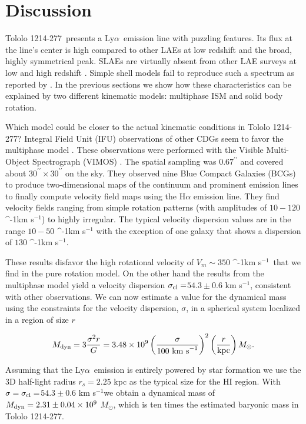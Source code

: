 \documentclass[a4paper,fleqn,usenatbib]{mnras}
\newcommand{\tol}{Tololo 1214-277}
\newcommand{\lya}{\ifmmode{{\rm Ly}\alpha}\else Ly$\alpha$\ \fi}
\newcommand{\kms}{\ifmmode\mathrm{km\ s}^{-1}\else km s$^{-1}$\fi}
\newcommand{\sigmaclump}{$54.3\pm 0.6$ km s$^{-1}$}
\begin{document}
\section{Discussion}

\tol\ presents a \lya emission line with puzzling features.
Its flux at the line's center is high compared to other LAEs at low
redshift and the broad, highly symmetrical peak.
SLAEs are virtually absent from other LAE surveys at low and high redshift
\citep{2012ApJ...751...29Y,LARS,Erb14,Trainor16}. 
Simple shell models
fail to reproduce such a spectrum as reported by \cite{2015A&A...578A...7V}.  
In the previous sections we show how these characteristics can be
explained by two different kinematic models: multiphase ISM and solid
body rotation.

Which model could be closer to the actual kinematic conditions in \tol?  
Integral Field Unit (IFU) observations of other CDGs seem to
favor the multiphase model \citep{2015A&A...577A..21C,2017arXiv170809407C,2017A&A...600A.125C}.
These observations  were performed with the Visible Multi-Object Spectrograph (VIMOS)
\citep{2003SPIE.4841.1670L}.
The spatial sampling was $0.67^{\prime\prime}$ and covered about
$30^{\prime\prime}\times 30^{\prime\prime}$ on the sky. 
They observed nine Blue Compact Galaxies (BCGs) to produce two-dimensional maps of the
continuum and prominent emission lines to finally compute velocity
field maps using the H$\alpha$ emission line. 
They find velocity fields ranging from simple rotation patterns 
(with amplitudes of $10-120$ \kms) to highly irregular. 
The typical velocity dispersion values are in the range $10-50$ \kms
with the exception of one galaxy that shows a dispersion of $130$
\kms. 

These results disfavor the high rotational velocity of $V_{m}\sim350$
\kms\  that we find in the pure rotation model. 
On the other hand the results from the multiphase model yield a
velocity dispersion $\sigma_{\rm cl}=$\sigmaclump, consistent with
other observations.
We can now estimate a value for the dynamical mass using the
constraints for the velocity dispersion, $\sigma$,  in a spherical
system localized in a region of size $r$     

\begin{equation}
M_{\rm dyn} = 3 \frac{\sigma ^{2}r}{G} = 3.48\times10^{9}
\left(\frac{\sigma}{100\ \mathrm{km\ s}^{-1}}\right)^2\left(\frac{r}{\mathrm{kpc}}\right)
M_{\odot}. 
\end{equation}

Assuming that the \lya emission is entirely powered by star formation 
we use the 3D half-light radius $r_s=2.25$ kpc as the typical size
for the HI region. 
With $\sigma=\sigma_{\rm{cl}}=$\sigmaclump we obtain a dynamical mass
of  $M_{\rm dyn}=2.31\pm0.04 \times 10^{9}$ $M_{\odot}$, which is ten
times the estimated baryonic mass in \tol. 
\end{document}
